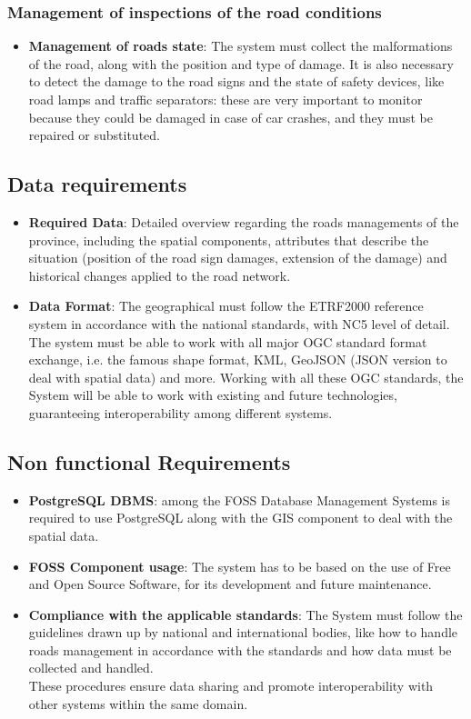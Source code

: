    \subsubsection{\textbf{Management of inspections of the road conditions}} 
    \begin{itemize}
        \item{\textbf{Management of roads state}}: The system must collect the malformations of the road, along with the position and type of damage.
        It is also necessary to detect the damage to the road signs and the state of safety devices, like road lamps and traffic separators: these are very important to monitor because they could be damaged in case of car crashes, and they must be repaired or substituted.
     \end{itemize}

     \subsection{Data requirements}
        \begin{itemize}
            \item \textbf{Required Data}: Detailed overview regarding the roads managements of the province, including the spatial components, attributes that describe the situation (position of the road sign damages, extension of the damage) and historical changes applied to the road network.
             \item \textbf{Data Format}:  The geographical must follow the ETRF2000 reference system in accordance with the national standards, with NC5 level of detail.
             The system must be able to work with all major OGC standard format exchange, i.e. the famous shape format, KML, GeoJSON (JSON version to deal with spatial data) and more.
             Working with all these OGC standards, the System will be able to work with existing and future technologies, guaranteeing interoperability among different systems.
        \end{itemize}
\pagebreak
\subsection{Non functional Requirements}
\begin{itemize}
    \item \textbf{PostgreSQL DBMS}: among the FOSS Database
    Management Systems is required to use PostgreSQL along with the GIS component to deal with the spatial data.
     \item \textbf{FOSS Component usage}: The system has to be based on the use of Free and Open Source Software, for its development and future maintenance.
    \item \textbf{Compliance with the applicable standards}: The System must follow the guidelines drawn up by national and international bodies, like how to handle roads management in accordance with the standards and how data must be collected and handled.
    \\
    These procedures ensure data sharing and promote interoperability with other systems within the same domain.
\end{itemize}